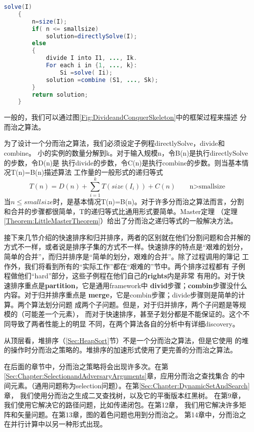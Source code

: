 \begin{figure*}[!t]
    \centering
    \begin{lstlisting}[language={Java},keywordstyle=\color{blue!70}, commentstyle=\color{red!50!green!50!blue!50}]
    solve(I)
    {
        n=size(I);
        if( n <= smallsize)
            solution=directlySolve(I);
        else
        {
            divide I into I1, ..., Ik.
            For each i in {1, ..., k}:
                Si =solve( Ii);
            solution =combine (S1, ..., Sk);
        }
        return solution;
    }
    \end{lstlisting}
    \caption{分而治之骨架}
    \label{Fig:DivideandConquerSkeleton}
\end{figure*}
一般的，我们可以通过图\ref{Fig:DivideandConquerSkeleton}中的框架过程来描述
分而治之算法。

为了设计一个分而治之算法，我们必须设定子例程directlySolve，divide和combine。
小的实例的数量分解到k。对于输入规模n，令B(n)是执行directlySolve的步数，令D(n)是
执行divide的步数，令C(n)是执行combine的步数。则当基本情况T(n)=B(n)描述算法
工作量的一般形式的递归等式
\begin{displaymath}
T(n)=D(n)+\sum_{i=1}^kT(size(I_i))+C(n) \qquad \mbox{n>smallsize}
\end{displaymath}
当$n\leq smallsize$时，是基本情况T(n)=B(n)。对于许多分而治之算法而言，分割
和合并的步骤都很简单，T的递归等式比通用形式要简单。Master定理
（定理\ref{Theorem:LittleMasterTheorem}）给出了分而治之递归等式的一般解决方法。

接下来几节介绍的快速排序和归并排序，两者的区别就在他们分割问题和合并解的
方式不一样，或者说是排序子集的方式不一样。快速排序的特点是“艰难的划分，
简单的合并”，而归并排序是“简单的划分，艰难的合并”。除了过程调用的簿记
工作外，我们将看到所有的“实际工作”都在“艰难的”节中。两个排序过程都有
子例程做他们“hard”部分，这些子例程在他们自己的\textbf{rights}内是非常
有用的。对于快速排序重点是\textbf{partition}，它是通用framework中
\textbf{divid}步骤；\textbf{combin}步骤没什么内容。对于归并排序重点是
\textbf{merge}，它是combin步骤；divide步骤则是简单的计算。两个算法划分问题
成两个子问题。但是，对于归并排序，两个子问题是等规模的（可能差一个元素），
而对于快速排序，甚至子划分都是不能保证的。这个不同导致了两者性能上的明显
不同，在两个算法各自的分析中有详细discovery。

从顶层看，堆排序（\ref{Sec:HeapSort}节）不是一个分而治之算法，但是它使用
的堆的操作时分而治之策略的。堆排序的加速形式使用了更完善的分而治之算法。

在后面的章节中，分而治之策略将会出现许多次。在第
\ref{Sec:Chapter:SelectionandAdversaryArguments}章，应用分而治之查找集合
的中间元素。（通用问题称为selection问题）。在第\ref{Sec:Chapter:DynamicSetAndSearch}章，
我们使用分而治之生成二叉查找树，以及它的平衡版本红黑树。
在第9章，我们使用它解决它的路径问题，比如传递闭包。在第12章，
我们用它解决许多矩阵和矢量问题。在第13章，图的着色问题也用到分而治之。
第14章中，分而治之在并行计算中以另一种形式出现。

